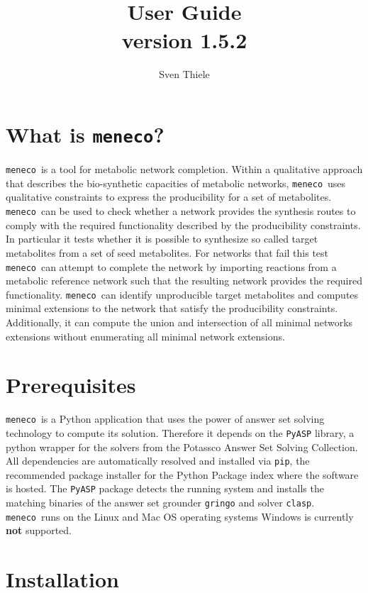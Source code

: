 \documentclass{article}
\title{ \meneco  \\
User Guide \\
version 1.5.2
}
\author{Sven Thiele}
\date{}
\newcommand\meneco{\texttt{meneco}}
\begin{document}
\maketitle

\section{What is \meneco?}

\meneco\ is a tool for metabolic network completion.
Within a qualitative approach that describes the bio-synthetic capacities of metabolic networks,
 \meneco\ uses qualitative constraints to express the producibility for a set of metabolites.
\meneco\ can be used to check whether a network provides the synthesis routes to comply
 with the required functionality described by the producibility constraints.
In particular it tests whether it is possible to synthesize so called target metabolites from a set of seed metabolites.
For networks that fail this test \meneco\ can attempt to complete the network by importing reactions
from a metabolic reference network such that the resulting network provides the required functionality.
\meneco\ can identify unproducible target metabolites and computes minimal extensions to the network that satisfy the producibility constraints.
Additionally, it can compute the union and intersection of all minimal networks extensions without enumerating all minimal network extensions.


\section{Prerequisites}
\meneco\ is a Python application that uses the power of answer set solving technology to compute its solution.
Therefore it depends on the \texttt{PyASP} library, a python wrapper for the solvers from the Potassco Answer Set Solving Collection.
All dependencies are automatically resolved and installed via \texttt{pip}, the recommended package installer for the Python Package index where the software is hosted.
The \texttt{PyASP} package detects the running system and installs the matching binaries of the answer set grounder \texttt{gringo} and solver \texttt{clasp}.
\meneco\ runs on the Linux and Mac OS operating systems Windows is currently {\bf not} supported.


\section{Installation}
\end{document}
